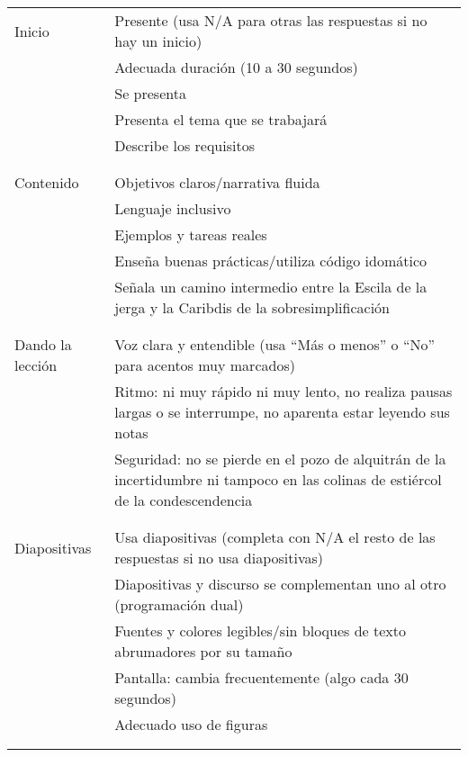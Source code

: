 \noindent
\begin{longtable}{p{}p{}}

  Inicio
  & Presente (usa N/A para otras las respuestas si no hay un inicio) \\
  & Adecuada duración (10 a 30 segundos) \\
  & Se presenta \\
  & Presenta el tema que se trabajará \\
  & Describe los requisitos \\
  \\ [-1.5ex] \hline \\ [-1.5ex]

  Contenido
  & Objetivos claros/narrativa fluida \\
  & Lenguaje inclusivo \\
  & Ejemplos y tareas reales \\
  & Enseña buenas prácticas/utiliza código idomático\\
  & Señala un camino intermedio entre la Escila de la jerga y la Caribdis de la sobresimplificación \\
  \\ [-1.5ex] \hline \\ [-1.5ex]

  Dando la lección
  & Voz clara y entendible (usa ``Más o menos'' o ``No'' para acentos muy marcados) \\
  & Ritmo: ni muy rápido ni muy lento, no realiza pausas largas o se interrumpe, no aparenta estar leyendo sus notas \\
  & Seguridad: no se pierde en el pozo de alquitrán de la incertidumbre ni tampoco en las colinas de estiércol de la condescendencia \\
  \\ [-1.5ex] \hline \\ [-1.5ex]

  Diapositivas
  & Usa diapositivas (completa con N/A el resto de las respuestas si no usa diapositivas) \\
  & Diapositivas y discurso se complementan uno al otro (programación dual) \\
  & Fuentes y colores legibles/sin bloques de texto abrumadores por su tamaño\\
  & Pantalla: cambia frecuentemente (algo cada 30 segundos) \\
  & Adecuado uso de figuras \\
  \\ [-1.5ex] \hline \\ [-1.5ex]


\end{longtable}
